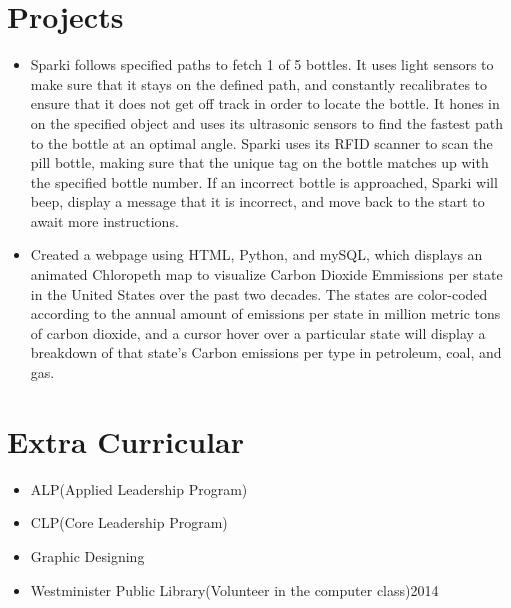 \documentclass[10pt,a4paper,sans]{moderncv} %
\begin{document}
\section {Projects}
\begin{itemize}
\item{Sparki follows specified paths to fetch 1 of 5 bottles. It uses light sensors to make sure that it stays on the defined path, and constantly recalibrates to ensure that it does not get off track in order to  locate the bottle. It hones in on the specified object and uses its ultrasonic sensors to find the fastest path to the bottle at an optimal angle. Sparki uses its RFID scanner to scan the pill bottle, making sure that the unique tag on the bottle matches up with the specified bottle number. If an incorrect bottle is approached, Sparki will beep, display a message that it is incorrect, and move back to the start to await more instructions.}
\end{itemize}
\hfill \break
{}
\begin{itemize}
\item{ Created a webpage using HTML, Python, and mySQL, which displays an animated Chloropeth map to visualize Carbon Dioxide Emmissions per state in the United States over the past two decades. The states are color-coded according to the annual amount of emissions per state in million metric tons of carbon dioxide, and a cursor hover over a particular state will display a breakdown of that state's Carbon emissions per type in petroleum, coal, and gas.}
\end{itemize}

\section{Extra Curricular}
\begin{itemize}
\item{}{ALP(Applied Leadership Program)}
\item{}{CLP(Core Leadership Program)}
\item{}{Graphic Designing}
\item{}{Westminister Public Library(Volunteer in the computer class){2014}}
\end{itemize}
\end{document}
